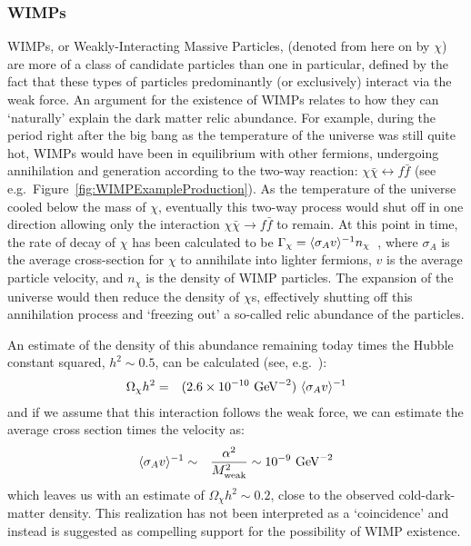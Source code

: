 			\subsubsection{WIMPs}
 WIMPs, or Weakly-Interacting Massive Particles, (denoted from here on by $\chi$) are more of a class of candidate particles than one in particular, defined by the fact that these types of particles predominantly (or exclusively) interact via the weak force.  An argument for the existence of WIMPs relates to how they can `naturally' explain the dark matter relic abundance.
  For example, during the period right after the big bang as the temperature of the universe was still quite hot, WIMPs would have been in equilibrium with other fermions, undergoing annihilation and generation according to the two-way reaction: $\chi\bar{\chi} \leftrightarrow f\bar{f} $ (see e.g.~Figure~\ref{fig:WIMPExampleProduction}).  As the temperature of the universe cooled below the mass of $\chi$, eventually this two-way process would shut off in one direction allowing only the interaction $\chi\bar{\chi} \rightarrow f\bar{f} $ to remain.  At this point in time, the rate of decay of $\chi$ has been calculated to be $\Gamma_{\chi} = \langle \sigma_{A} v \rangle^{-1} n_{\chi}$~\cite{Jun96}, where $\sigma_{A}$ is the average cross-section for $\chi$ to annihilate into lighter fermions, $v$ is the average particle velocity, and $n_{\chi}$ is the density of WIMP particles.  The expansion of the universe would then reduce the density of $\chi$s, effectively shutting off this annihilation process and `freezing out' a so-called relic abundance of the particles.  

An estimate of the density of this abundance remaining today times the Hubble constant squared, $h^{2}\sim0.5$, can be calculated (see, e.g.~\cite{Jun96}):
			\begin{eqnarray}
				\Omega_{\chi} h^{2} & = & (2.6 \times 10^{-10}~\text{GeV}^{-2})~\langle \sigma_{A} v \rangle^{-1} \\
			\end{eqnarray}
and if we assume that this interaction follows the weak force, we can estimate the average cross section times the velocity as:
			\begin{eqnarray}
				\langle \sigma_{A} v \rangle^{-1} & \sim & \frac{\alpha^{2}}{M_{\text{weak}}^{2}} \sim 10^{-9}~\text{GeV}^{-2}\\			
			\end{eqnarray}
which leaves us with an estimate of 	$\Omega_{\chi} h^{2} \sim 0.2$, close to the observed cold-dark-matter density.  This realization has not been interpreted as a `coincidence' and instead is suggested as compelling support for the possibility of WIMP existence.  
		
